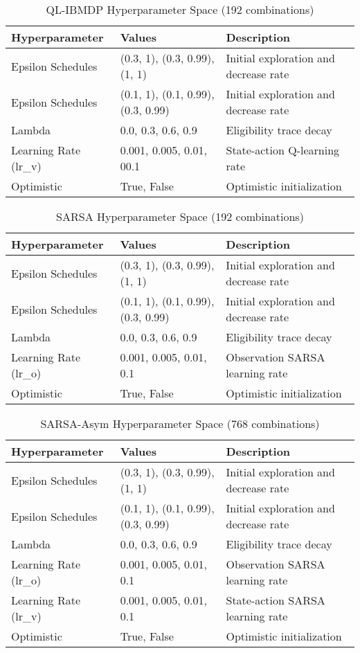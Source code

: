 \begin{table}
\small
\centering
\caption{QL-IBMDP Hyperparameter Space (192 combinations)}
\begin{tabular}{lll}
\toprule
\textbf{Hyperparameter} & \textbf{Values} & \textbf{Description} \\
\midrule
Epsilon Schedules & (0.3, 1), (0.3, 0.99), (1, 1) & Initial exploration and decrease rate \\
Epsilon Schedules & (0.1, 1), (0.1, 0.99), (0.3, 0.99) & Initial exploration and decrease rate \\
Lambda & 0.0, 0.3, 0.6, 0.9 & Eligibility trace decay \\
Learning Rate (lr\_v) & 0.001, 0.005, 0.01, 00.1 & State-action Q-learning rate \\
Optimistic & True, False & Optimistic initialization \\
\bottomrule
\end{tabular}
\end{table}

\begin{table}
\small
\centering
\caption{SARSA Hyperparameter Space (192 combinations)}
\begin{tabular}{lll}
\toprule
\textbf{Hyperparameter} & \textbf{Values} & \textbf{Description} \\
\midrule
Epsilon Schedules & (0.3, 1), (0.3, 0.99), (1, 1) & Initial exploration and decrease rate \\
Epsilon Schedules & (0.1, 1), (0.1, 0.99), (0.3, 0.99) & Initial exploration and decrease rate \\
Lambda & 0.0, 0.3, 0.6, 0.9 & Eligibility trace decay \\
Learning Rate (lr\_o) & 0.001, 0.005, 0.01, 0.1 & Observation SARSA learning rate \\
Optimistic & True, False & Optimistic initialization \\
\bottomrule
\end{tabular}
\end{table}

\begin{table}
\small
\centering
\caption{SARSA-Asym Hyperparameter Space (768 combinations)}
\begin{tabular}{lll}
\toprule
\textbf{Hyperparameter} & \textbf{Values} & \textbf{Description} \\
\midrule
Epsilon Schedules & (0.3, 1), (0.3, 0.99), (1, 1) & Initial exploration and decrease rate \\
Epsilon Schedules & (0.1, 1), (0.1, 0.99), (0.3, 0.99) & Initial exploration and decrease rate \\
Lambda & 0.0, 0.3, 0.6, 0.9 & Eligibility trace decay \\
Learning Rate (lr\_o) & 0.001, 0.005, 0.01, 0.1 & Observation SARSA learning rate \\
Learning Rate (lr\_v) & 0.001, 0.005, 0.01, 0.1 & State-action SARSA learning rate \\
Optimistic & True, False & Optimistic initialization \\
\bottomrule
\end{tabular}
\end{table}

